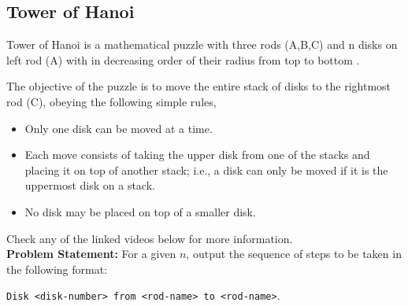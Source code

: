 \recalctypearea
\subsection{Tower of Hanoi}
Tower of Hanoi is a mathematical puzzle with three rods (A,B,C) and n disks on left rod (A) with in decreasing
order of their radius from top to bottom .

The objective of the puzzle is to move the entire stack of disks to the
rightmost rod (C), obeying the following simple rules,
\begin{itemize}
	\item Only one disk can be moved at a time.
	\item Each move consists of taking the upper disk from one of the stacks and placing it on top of another stack; i.e., a disk can only be moved if it is the uppermost disk on a stack.
	\item No disk may be placed on top of a smaller disk.
\end{itemize}
Check any of the linked videos below for more information.\\
\textbf{Problem Statement:}
For a given $n$, output the sequence of steps to be taken in the following format:

\verb!Disk <disk-number> from <rod-name> to <rod-name>!.

